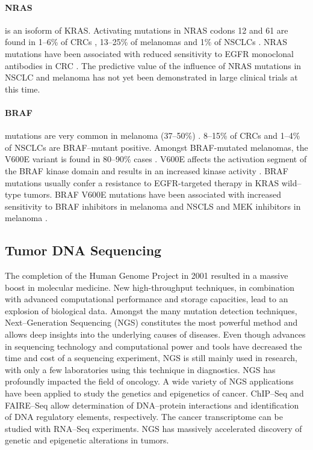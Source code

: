 {{{      \paragraph{NRAS} is an isoform of KRAS. Activating mutations in NRAS
      codons 12 and 61 are found in 1--6\% of CRCs {\cite{nras_crc}}, 13--25\% of melanomas {\cite{nras_melanoma}} and
      1\% of NSCLCs {\cite{nras_nsclc}}. NRAS mutations have been associated with reduced
      sensitivity to EGFR monoclonal antibodies in CRC {\cite{nras_crc}}. The predictive value of
      the influence of NRAS mutations in NSCLC and melanoma has not yet been
      demonstrated in large clinical trials at this time.

      \paragraph{BRAF} mutations are very common in melanoma (37--50\%) {\cite{braf_melanoma}}. 8--15\%
      of CRCs {\cite{braf_crc}} and 1--4\% of NSCLCs {\cite{braf_nsclc}} are BRAF--mutant positive. Amongst
      BRAF-mutated melanomas, the V600E variant is found in 80--90\% cases {\cite{braf_melanoma}}.
      V600E affects the activation segment of the BRAF kinase domain and results
      in an increased kinase activity {\cite{v600e}}. BRAF mutations usually confer a
      resistance to EGFR-targeted therapy in KRAS wild--type tumors. BRAF V600E
      mutations have been associated with increased sensitivity to BRAF
      inhibitors in melanoma and NSCLS and MEK inhibitors in melanoma {\cite{braf_melanoma}}.

  \subsection{Tumor DNA Sequencing}

    The completion of the Human Genome Project in 2001 resulted in a massive
    boost in molecular medicine. New high-throughput techniques, in combination
    with advanced computational performance and storage capacities, lead to an
    explosion of biological data. Amongst the many mutation detection
    techniques, Next--Generation Sequencing (NGS) constitutes the most powerful
    method and allows deep insights into the underlying causes of diseases.
    Even though advances in sequencing technology and computational power and
    tools have decreased the time and cost of a sequencing experiment, NGS is
    still mainly used in research, with only a few laboratories using this
    technique in diagnostics. NGS has profoundly impacted the field of
    oncology. A wide variety of NGS applications have been applied to study the
    genetics and epigenetics of cancer. ChIP--Seq and FAIRE--Seq allow
    determination of DNA--protein interactions and identification of DNA
    regulatory elements, respectively. The cancer transcriptome can be studied
    with RNA--Seq experiments. NGS has massively accelerated discovery of
    genetic and epigenetic alterations in tumors.

}}}
